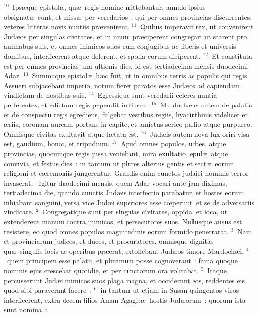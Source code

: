 ${}^{10}$~Ips\ae que epistol\ae , qu\ae\ regis nomine mittebantur, annulo ipsius obsignat\ae\ sunt, et miss\ae\ per veredarios~: qui per omnes provincias discurrentes, veteres litteras novis nuntiis pr\ae venirent.
${}^{11}$~Quibus imperavit rex, ut convenirent Jud\ae os per singulas civitates, et in unum pr\ae ciperent congregari ut starent pro animabus suis, et omnes inimicos suos cum conjugibus ac liberis et universis domibus, interficerent atque delerent, et spolia eorum diriperent.
${}^{12}$~Et constituta est per omnes provincias una ultionis dies, id est tertiadecima mensis duodecimi Adar.
${}^{13}$~Summaque epistol\ae\ h\ae c fuit, ut in omnibus terris ac populis qui regis Assueri subjacebant imperio, notum fieret paratos esse Jud\ae os ad capiendam vindictam de hostibus suis.
${}^{14}$~Egressique sunt veredarii celeres nuntia perferentes, et edictum regis pependit in Susan.
${}^{15}$~Mardoch\ae us autem de palatio et de conspectu regis egrediens, fulgebat vestibus regiis, hyacinthinis videlicet et \ae riis, coronam auream portans in capite, et amictus serico pallio atque purpureo. Omnisque civitas exultavit atque l\ae tata est.
${}^{16}$~Jud\ae is autem nova lux oriri visa est, gaudium, honor, et tripudium.
${}^{17}$~Apud omnes populos, urbes, atque provincias, quocumque regis jussa veniebant, mira exultatio, epul\ae\ atque convivia, et festus dies~: in tantum ut plures alterius gentis et sect\ae\ eorum religioni et c\ae remoniis jungerentur. Grandis enim cunctos judaici nominis terror invaserat.
~Igitur duodecimi mensis, quem Adar vocari ante jam diximus, tertiadecima die, quando cunctis Jud\ae is interfectio parabatur, et hostes eorum inhiabant sanguini, versa vice Jud\ae i superiores esse cœperunt, et se de adversariis vindicare.
${}^{2}$~Congregatique sunt per singulas civitates, oppida, et loca, ut extenderent manum contra inimicos, et persecutores suos. Nullusque ausus est resistere, eo quod omnes populos magnitudinis eorum formido penetrarat.
${}^{3}$~Nam et provinciarum judices, et duces, et procuratores, omnisque dignitas qu\ae\ singulis locis ac operibus pr\ae erat, extollebant Jud\ae os timore Mardoch\ae i,
${}^{4}$~quem principem esse palatii, et plurimum posse cognoverant~: fama quoque nominis ejus crescebat quotidie, et per cunctorum ora volitabat.
${}^{5}$~Itaque percusserunt Jud\ae i inimicos suos plaga magna, et occiderunt eos, reddentes eis quod sibi paraverant facere~:
${}^{6}$~in tantum ut etiam in Susan quingentos viros interficerent, extra decem filios Aman Agagit\ae\ hostis Jud\ae orum~: quorum ista sunt nomina~:
